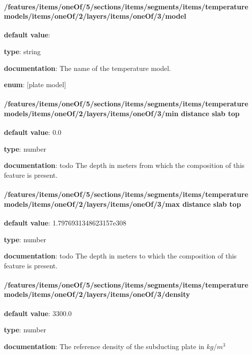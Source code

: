 \paragraph{/features/items/oneOf/5/sections/items/segments/items/temperature models/items/oneOf/2/layers/items/oneOf/3/model} \begin{itemized}
\item {\bf default value}: 
\item {\bf type}: string
\item {\bf documentation}: The name of the temperature model.
\item {\bf enum}: [plate model]\end{itemized}\paragraph{/features/items/oneOf/5/sections/items/segments/items/temperature models/items/oneOf/2/layers/items/oneOf/3/min distance slab top} \begin{itemized}
\item {\bf default value}: 0.0
\item {\bf type}: number
\item {\bf documentation}: todo The depth in meters from which the composition of this feature is present.
\end{itemized}\paragraph{/features/items/oneOf/5/sections/items/segments/items/temperature models/items/oneOf/2/layers/items/oneOf/3/max distance slab top} \begin{itemized}
\item {\bf default value}: 1.7976931348623157e308
\item {\bf type}: number
\item {\bf documentation}: todo The depth in meters to which the composition of this feature is present.
\end{itemized}\paragraph{/features/items/oneOf/5/sections/items/segments/items/temperature models/items/oneOf/2/layers/items/oneOf/3/density} \begin{itemized}
\item {\bf default value}: 3300.0
\item {\bf type}: number
\item {\bf documentation}: The reference density of the subducting plate in $kg/m^3$

\end{itemized}
